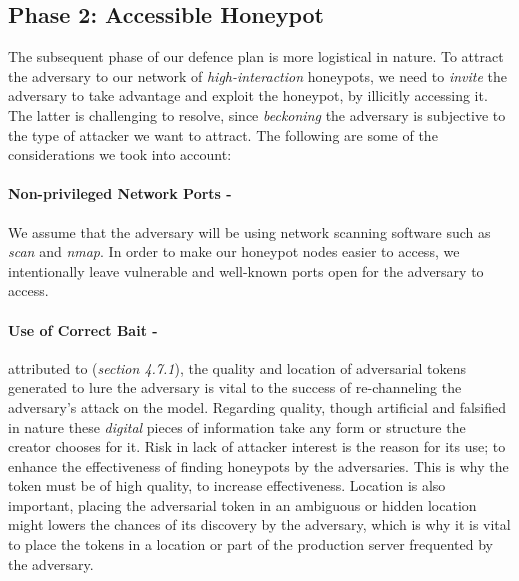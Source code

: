 \documentclass[grad,lot,lof,11pt,oneside,onehalfspace]{RUthesis}
\begin{document}
\subsection{Phase 2: Accessible Honeypot }  
The subsequent phase of our defence plan is more logistical in nature. To attract the adversary to our network of \textit{high-interaction} honeypots, we need to \textit{invite} the adversary to take advantage and exploit the honeypot, by illicitly accessing it. The latter is challenging to resolve, since \textit{beckoning} the adversary is subjective to the type of attacker we want to attract. The following are some of the considerations we took into account:
\paragraph{Non-privileged Network Ports -} We assume that the adversary will be using network scanning software such as \textit{scan} and \textit{nmap}. In order to make our honeypot nodes easier to access, we intentionally leave vulnerable and well-known ports open for the adversary to access. 
\paragraph{Use of Correct Bait -} attributed to (\textit{section 4.7.1}), the quality and location of adversarial tokens generated to lure the adversary is vital to the success of re-channeling the adversary's attack on the model. Regarding quality, though artificial and falsified in nature these \textit{digital} pieces of information take any form or structure the creator chooses for it. Risk in lack of attacker interest is the reason for its use; to enhance the effectiveness of finding honeypots by the adversaries. This is why the token must be of high quality, to increase effectiveness. Location is also important, placing the adversarial token in an ambiguous or hidden location might lowers the chances of its discovery by the adversary, which is why it is vital to place the tokens in a location or part of the production server frequented by the adversary.  
\end{document}
